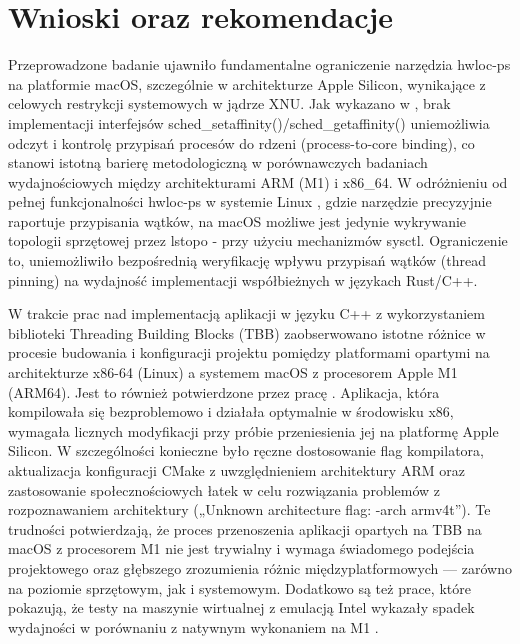 \chapter{Wnioski oraz rekomendacje}
Przeprowadzone badanie ujawniło fundamentalne ograniczenie narzędzia hwloc-ps na platformie macOS, szczególnie w architekturze Apple Silicon, wynikające z celowych restrykcji systemowych w jądrze XNU. Jak wykazano w \cite{HWLOC555}, brak implementacji interfejsów sched\_setaffinity()/sched\_getaffinity() uniemożliwia odczyt i kontrolę przypisań procesów do rdzeni (process-to-core binding), co stanowi istotną barierę metodologiczną w porównawczych badaniach wydajnościowych między architekturami ARM (M1) i x86\_64. W odróżnieniu od pełnej funkcjonalności hwloc-ps w systemie Linux \cite{hwlocHardwareLocality}, gdzie narzędzie precyzyjnie raportuje przypisania wątków, na macOS możliwe jest jedynie wykrywanie topologii sprzętowej przez lstopo - przy użyciu mechanizmów sysctl. Ograniczenie to, uniemożliwiło bezpośrednią weryfikację wpływu przypisań wątków (thread pinning) na wydajność implementacji współbieżnych w językach Rust/C++.

W trakcie prac nad implementacją aplikacji w języku C++ z wykorzystaniem biblioteki Threading Building Blocks (TBB) zaobserwowano istotne różnice w procesie budowania i konfiguracji projektu pomiędzy platformami opartymi na architekturze x86-64 (Linux) a systemem macOS z procesorem Apple M1 (ARM64). Jest to również potwierdzone przez pracę \cite{ARMTBB}. Aplikacja, która kompilowała się bezproblemowo i działała optymalnie w środowisku x86, wymagała licznych modyfikacji przy próbie przeniesienia jej na platformę Apple Silicon. W szczególności konieczne było ręczne dostosowanie flag kompilatora, aktualizacja konfiguracji CMake z uwzględnieniem architektury ARM oraz zastosowanie społecznościowych łatek w celu rozwiązania problemów z rozpoznawaniem architektury („Unknown architecture flag: -arch armv4t”). Te trudności potwierdzają, że proces przenoszenia aplikacji opartych na TBB na macOS z procesorem M1 nie jest trywialny i wymaga świadomego podejścia projektowego oraz głębszego zrozumienia różnic międzyplatformowych — zarówno na poziomie sprzętowym, jak i systemowym. Dodatkowo są też prace, które pokazują, że testy na maszynie wirtualnej z emulacją Intel wykazały spadek wydajności w porównaniu z natywnym wykonaniem na M1 \cite{TBBARMCONCLUSIONS}.

